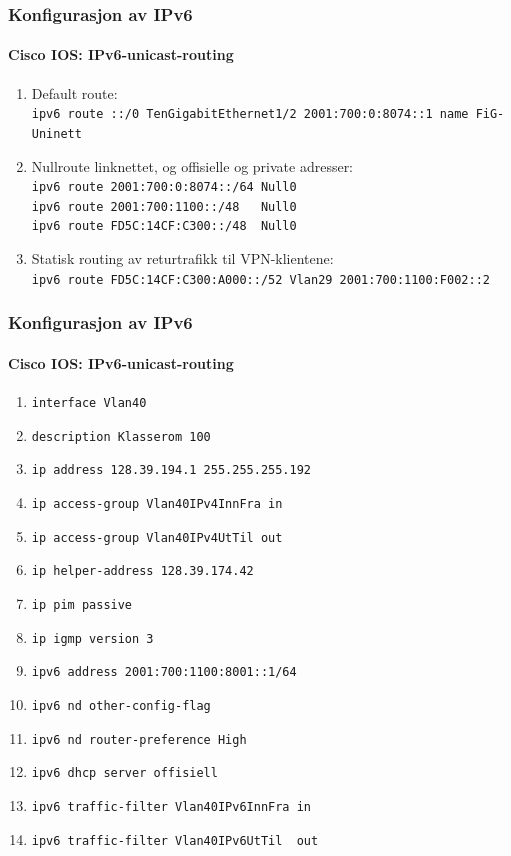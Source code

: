\begin{frame}%
  \frametitle{Konfigurasjon av IPv6}
  \framesubtitle{Cisco IOS: IPv6-unicast-routing}
  \begin{enumerate}[<+->]
  \item Default route:\\
    \alert{\texttt{ipv6 route ::/0 TenGigabitEthernet1/2 2001:700:0:8074::1 name FiG-Uninett}}
  \item Nullroute linknettet, og offisielle og private adresser:\\
    \alert{\texttt{ipv6 route 2001:700:0:8074::/64 Null0}}\\
    \alert{\texttt{ipv6 route 2001:700:1100::/48\ \ \ Null0}}\\
    \alert{\texttt{ipv6 route FD5C:14CF:C300::/48\ \  Null0}}
  \item Statisk routing av returtrafikk til VPN-klientene:\\
    \alert{\texttt{ipv6 route FD5C:14CF:C300:A000::/52 Vlan29 2001:700:1100:F002::2}}
  \end{enumerate}
\end{frame}

\begin{frame}%
  \frametitle{Konfigurasjon av IPv6}
  \framesubtitle{Cisco IOS: IPv6-unicast-routing}
  \begin{enumerate}[<+->]
  \item \alert{\texttt{interface Vlan40}}
  \item \texttt{description Klasserom 100}
  \item \texttt{ip address 128.39.194.1 255.255.255.192}
  \item \texttt{ip access-group Vlan40IPv4InnFra in}
  \item \texttt{ip access-group Vlan40IPv4UtTil out}
  \item \texttt{ip helper-address 128.39.174.42}
  \item \texttt{ip pim passive}
  \item \texttt{ip igmp version 3}
  \item \alert{\texttt{ipv6 address 2001:700:1100:8001::1/64}}
  \item \alert{\texttt{ipv6 nd other-config-flag}}
  \item \alert{\texttt{ipv6 nd router-preference High}}
  \item \alert{\texttt{ipv6 dhcp server offisiell}}
  \item \alert{\texttt{ipv6 traffic-filter Vlan40IPv6InnFra in}}
  \item \alert{\texttt{ipv6 traffic-filter Vlan40IPv6UtTil\ \ out}}
  \end{enumerate}
\end{frame}


